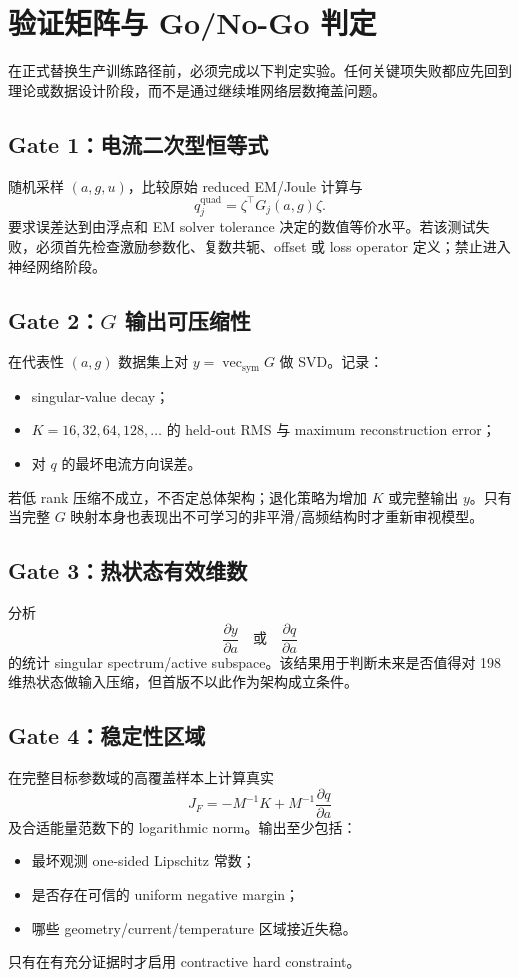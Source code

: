 \section{验证矩阵与 Go/No-Go 判定}

在正式替换生产训练路径前，必须完成以下判定实验。任何关键项失败都应先回到理论或数据设计阶段，而不是通过继续堆网络层数掩盖问题。

\subsection{Gate 1：电流二次型恒等式}
随机采样 $(a,g,u)$，比较原始 reduced EM/Joule 计算与
\begin{equation}
q_j^{\mathrm{quad}}=\zeta^\top G_j(a,g)\zeta.
\end{equation}
要求误差达到由浮点和 EM solver tolerance 决定的数值等价水平。若该测试失败，必须首先检查激励参数化、复数共轭、offset 或 loss operator 定义；禁止进入神经网络阶段。

\subsection{Gate 2：$G$ 输出可压缩性}
在代表性 $(a,g)$ 数据集上对 $y=\operatorname{vec}_{\mathrm{sym}}G$ 做 SVD。记录：
\begin{itemize}
  \item singular-value decay；
  \item $K=16,32,64,128,\ldots$ 的 held-out RMS 与 maximum reconstruction error；
  \item 对 $q$ 的最坏电流方向误差。
\end{itemize}
若低 rank 压缩不成立，不否定总体架构；退化策略为增加 $K$ 或完整输出 $y$。只有当完整 $G$ 映射本身也表现出不可学习的非平滑/高频结构时才重新审视模型。

\subsection{Gate 3：热状态有效维数}
分析
\begin{equation}
\frac{\partial y}{\partial a}
\quad\text{或}\quad
\frac{\partial q}{\partial a}
\end{equation}
的统计 singular spectrum/active subspace。该结果用于判断未来是否值得对 198 维热状态做输入压缩，但首版不以此作为架构成立条件。

\subsection{Gate 4：稳定性区域}
在完整目标参数域的高覆盖样本上计算真实
\begin{equation}
J_F=-M^{-1}K+M^{-1}\frac{\partial q}{\partial a}
\end{equation}
及合适能量范数下的 logarithmic norm。输出至少包括：
\begin{itemize}
  \item 最坏观测 one-sided Lipschitz 常数；
  \item 是否存在可信的 uniform negative margin；
  \item 哪些 geometry/current/temperature 区域接近失稳。
\end{itemize}
只有在有充分证据时才启用 contractive hard constraint。

